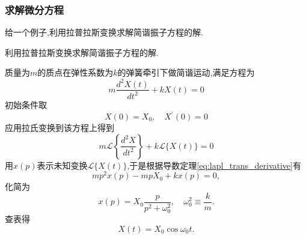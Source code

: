 \subsubsection{求解微分方程}
给一个例子,利用拉普拉斯变换求解简谐振子方程的解.
\begin{example}
利用拉普拉斯变换求解简谐振子方程的解.
\end{example}
\begin{solution}
    质量为$m$的质点在弹性系数为$k$的弹簧牵引下做简谐运动,满足方程为
    $$
m \frac{d^2 X(t)}{d t^2}+k X(t)=0
$$
初始条件取
$$
X(0)=X_0, \quad X^{\prime}(0)=0
$$
应用拉氏变换到该方程上得到
$$
m \mathcal{L}\left\{\frac{d^2 X}{d t^2}\right\}+k \mathcal{L}\{X(t)\}=0
$$
用$x(p)$表示未知变换$\mathcal{L}\{ X(t)\}$,于是根据导数定理\eqref{eq:lapl_trans_derivative}有
$$
m p^2 x(p)-m p X_0+k x(p)=0,
$$
化简为
$$
x(p)=X_0 \frac{p}{p^2+\omega_0^2}, \quad \omega_0^2 \equiv \frac{k}{m} .
$$
查表得
$$
X(t)=X_0 \cos \omega_0 t.
$$
\end{solution}